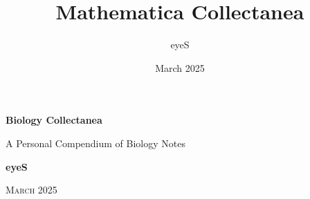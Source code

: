
\makeatletter
\let\@@pmod\pmod
\DeclareRobustCommand{\pmod}{\@ifstar\@pmods\@@pmod}
\def\@pmods#1{\mkern4mu({\operator@font mod}\mkern 6mu#1)}
\makeatother

\makeatletter
\makeatother

\title{Mathematica Collectanea}
\author{eyeS}
\date{March 2025}




\begin{titlepage}
    \centering
    \vspace*{3cm}
    {\Huge \bfseries Biology Collectanea \par}
    \vspace{0.5cm}
    {\large A Personal Compendium of Biology Notes\par}
    \vfill
    {\LARGE \bfseries eyeS\par}
    \vspace{0.5cm}
    {\Large \textsc{March 2025}}
\end{titlepage}

\tableofcontents
\clearpage





